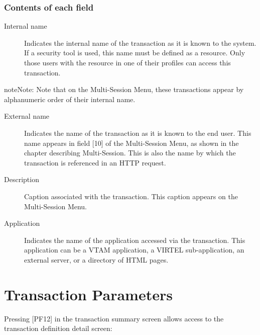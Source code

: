 \documentclass[letterpaper,10pt,english]{sphinxmanual}
\begin{document}
\subsubsection{Contents of each field}
\label{\detokenize{connectivity_guide:id16}}\begin{description}
\item[{Internal name}] \leavevmode
Indicates the internal name of the transaction as it is known to the system. If a security tool is used, this name must be defined as a resource. Only those users with the resource in one of their profiles can access this transaction.

\end{description}

\begin{sphinxadmonition}{note}{Note:}
Note that on the Multi-Session Menu, these transactions appear by alphanumeric order of their internal name.
\end{sphinxadmonition}
\begin{description}
\item[{External name}] \leavevmode
Indicates the name of the transaction as it is known to the end user. This name appears in field {[}10{]} of the Multi-Session Menu, as shown in the chapter describing Multi-Session. This is also the name by which the transaction is referenced in an HTTP request.

\item[{Description}] \leavevmode
Caption associated with the transaction. This caption appears on the Multi-Session Menu.

\item[{Application}] \leavevmode
Indicates the name of the application accessed via the transaction. This application can be a VTAM application, a VIRTEL sub-application, an external server, or a directory of HTML pages.

\end{description}


\section{Transaction Parameters}
\label{\detokenize{connectivity_guide:transaction-parameters}}
Pressing {[}PF12{]} in the transaction summary screen allows access to the transaction definition detail screen:

\end{document}
